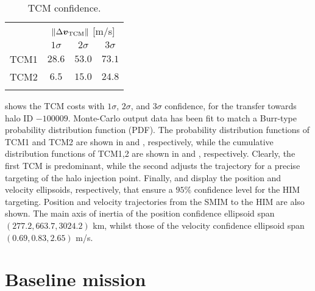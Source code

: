 %
\begin{table}[]
	\caption{TCM confidence.}
	\label{tab:TCMconfidence}
	\centering
	\begin{tabular}{cccc}
		\TOPlines
		\multirow{2}{*}{TCM} & \multicolumn{3}{c}{$\|\Delta\boldsymbol{v}_{\textrm{TCM}}\|$ [m/s]} \\
		& $1\sigma$ & $2\sigma$ & $3\sigma$ \\
		\MIDline
		TCM1 & $28.6$ & $53.0$ & $73.1$ \\
		TCM2 & $6.5$ & $15.0$ & $24.8$ \\
		\BOTTOMlines
	\end{tabular}
\end{table}
%
 shows the {TCM} costs with $1\sigma$, $2\sigma$, and $3\sigma$ confidence, for the transfer towards halo ID $-100009$. Monte-Carlo output data has been fit to match a Burr-type probability distribution function (PDF). The probability distribution functions of TCM1 and TCM2 are shown in  and , respectively, while the cumulative distribution functions of TCM1,2 are shown in  and , respectively. Clearly, the first {TCM} is predominant, while the second adjusts the trajectory for a precise targeting of the halo injection point. Finally,  and  display the position and velocity ellipsoids, respectively, that ensure a $95\%$ confidence level for the {HIM} targeting. Position and velocity trajectories from the {SMIM} to the {HIM} are also shown. The main axis of inertia of the position confidence ellipsoid span $(277.2,663.7,3024.2)$ km, whilst those of the velocity confidence ellipsoid span $(0.69,0.83,2.65)$ m/s.

\section{Baseline mission} \label{sec:baseline_mission}
